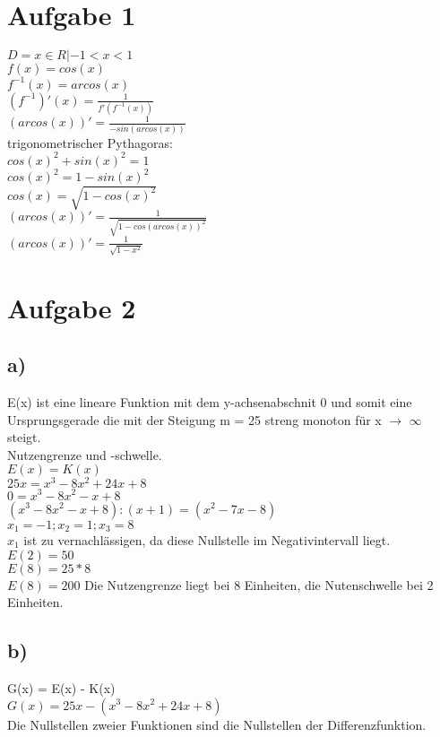 \documentclass{article}
\begin{document}
	\section*{Aufgabe 1}
	$D = x \in R | -1 < x < 1$ \\
	$f(x) = cos(x)$ \\
	$f^{-1}(x) = arcos(x)$ \\
	$(f^{-1})'(x) = \frac{1}{f'(f^{-1}(x))}$ \\
	$(arcos(x))' = \frac{1}{-sin(arcos(x))}$ \\
	trigonometrischer Pythagoras: \\
	$cos(x)^2 + sin(x)^2 = 1$ \\
	$cos(x)^2 = 1 - sin(x)^2$ \\
	$cos(x) = \sqrt{1 - cos(x)^2}$ \\
	$(arcos(x))' = \frac{1}{\sqrt{1-cos(arcos(x))^2}}$ \\
	$(arcos(x))' = \frac{1}{\sqrt{1-x^2}}$ \\
	\section*{Aufgabe 2}
	\subsection*{a)}
	E(x) ist eine lineare Funktion mit dem y-achsenabschnit 0 und somit eine Ursprungsgerade die mit der Steigung m = 25 streng monoton für x $\to$ $\infty$ steigt. \\
	Nutzengrenze und -schwelle. \\
	$E(x) = K(x)$ \\
	$25x = x^3 - 8x^2 + 24x + 8$ \\
	$0 = x^3 - 8x^2 - x + 8$ \\
	$(x^3 - 8x^2 - x + 8) : (x+1) = (x^2 - 7x - 8) $ \\
	$x_1 = -1; x_2 = 1; x_3 = 8$  \\
	$x_1$ ist zu vernachlässigen, da diese Nullstelle im Negativintervall liegt. \\
	$E(2) = 50$ \\
	$E(8) = 25 * 8$ \\
	$E(8) = 200$
	Die Nutzengrenze liegt bei 8 Einheiten, die Nutenschwelle bei 2 Einheiten. \\
	\subsection*{b)}
	G(x) = E(x) - K(x) \\
	$G(x) = 25x -  (x^3 - 8x^2 + 24x + 8)$ \\
	Die Nullstellen zweier Funktionen sind die Nullstellen der Differenzfunktion.
\end{document}
